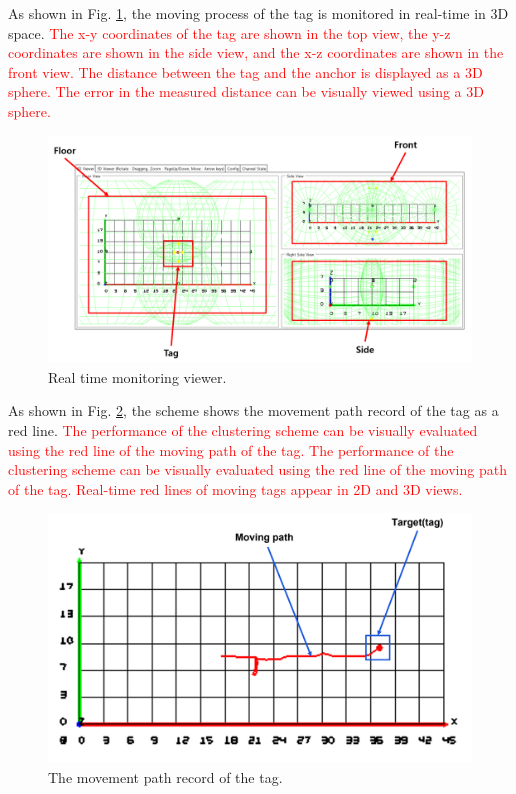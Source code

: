 \documentclass[conference]{IEEEtran}
\begin{document}
As shown in Fig. \ref{fig6}, the moving process of the tag is monitored in real-time in 3D space. \textcolor{red}{The x-y coordinates of the tag are shown in the top view, the y-z coordinates are shown in the side view, and the x-z coordinates are shown in the front view. The distance between the tag and the anchor is displayed as a 3D sphere. The error in the measured distance can be visually viewed using a 3D sphere.}

\begin{figure}[htbp]
    \centerline{\includegraphics[width=0.8\columnwidth]{fig6.png}}
    \caption{Real time monitoring viewer.}
    \label{fig6}
\end{figure}

As shown in Fig. \ref{fig7}, the scheme shows the movement path record of the tag as a red line. \textcolor{red}{The performance of the clustering scheme can be visually evaluated using the red line of the moving path of the tag. The performance of the clustering scheme can be visually evaluated using the red line of the moving path of the tag. Real-time red lines of moving tags appear in 2D and 3D views.}

\begin{figure}[htbp]
    \centerline{\includegraphics[width=0.8\columnwidth]{fig7.png}}
    \caption{The movement path record of the tag.}
    \label{fig7}
\end{figure}
\end{document}
